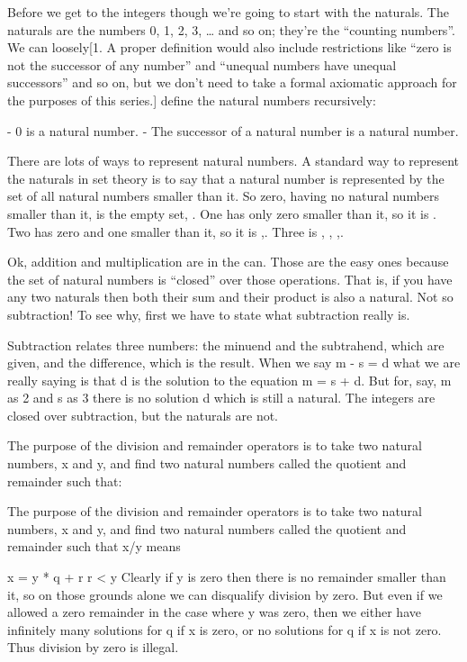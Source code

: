 
Before we get to the integers though we’re going to start with the naturals. The naturals are the numbers 0, 1, 2, 3, … and so on; they’re the “counting numbers”. We can loosely[1. A proper definition would also include restrictions like “zero is not the successor of any number” and “unequal numbers have unequal successors” and so on, but we don’t need to take a formal axiomatic approach for the purposes of this series.] define the natural numbers recursively:

- 0 is a natural number.
- The successor of a natural number is a natural number.

There are lots of ways to represent natural numbers. A standard way to represent the naturals in set theory is to say that a natural number is represented by the set of all natural numbers smaller than it. So zero, having no natural numbers smaller than it, is the empty set, {}. One has only zero smaller than it, so it is {{}}. Two has zero and one smaller than it, so it is {{},{{}}}.  Three is {{}, {{}}, {{},{{}}}}. 

Ok, addition and multiplication are in the can. Those are the easy ones because the set of natural numbers is “closed” over those operations. That is, if you have any two naturals then both their sum and their product is also a natural. Not so subtraction! To see why, first we have to state what subtraction really is.

Subtraction relates three numbers: the minuend and the subtrahend, which are given, and the difference, which is the result. When we say m - s = d what we are really saying is that d is the solution to the equation m = s + d. But for, say, m as 2 and s as 3 there is no solution d which is still a natural. The integers are closed over subtraction, but the naturals are not.

The purpose of the division and remainder operators is to take two natural numbers, x and y, and find two natural numbers called the quotient and remainder such that:


The purpose of the division and remainder operators is to take two natural numbers, x and y, and find two natural numbers called the quotient and remainder such that x/y means 

x = y * q + r
r < y
Clearly if y is zero then there is no remainder smaller than it, so on those grounds alone we can disqualify division by zero. But even if we allowed a zero remainder in the case where y was zero, then we either have infinitely many solutions for q if x is zero, or no solutions for q if x is not zero. Thus division by zero is illegal.

